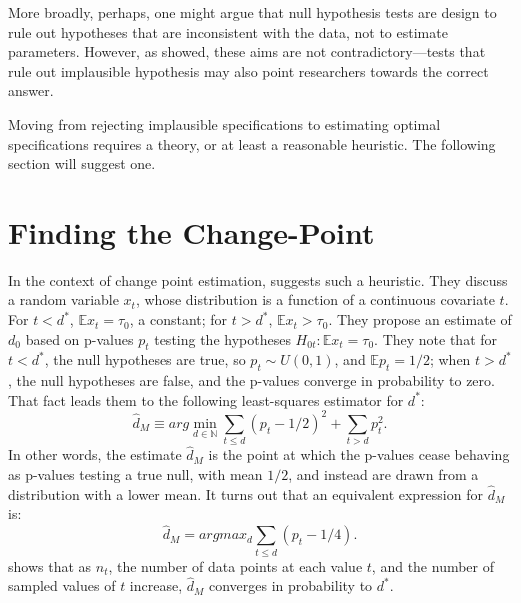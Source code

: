\documentclass[12pt]{article}\usepackage[]{graphicx}\usepackage[]{color}
\newcommand{\dstar}{d^*}
\newcommand{\dhatm}{\hat{d}_M}
\newcommand{\EE}{\mathbb{E}}
\begin{document}
More broadly, perhaps, one might argue that null hypothesis tests are
design to rule out hypotheses that are inconsistent with the data, not
to estimate parameters.
However, as \citet{hodgeslehmann} showed, these aims are not
contradictory---tests that rule out implausible hypothesis may also
point researchers towards the correct answer.

Moving from rejecting implausible specifications to estimating optimal
specifications requires a theory, or at least a reasonable heuristic.
The following section will suggest one.

\section{Finding the Change-Point}\label{sec:change-point}
In the context of change point estimation, \citet{mallik} suggests
such a heuristic.
They discuss a random variable $x_t$, whose distribution is a function
of a continuous covariate $t$.
For $t<d^*$, $\EE x_t=\tau_0$, a constant; for $t>\dstar$, $\EE
x_t>\tau_0$.
They propose an estimate of $d_0$ based on p-values $p_t$
testing the hypotheses $H_{0t}:\EE x_t=\tau_0$.
They note that for $t<\dstar$, the null hypotheses are true, so
$p_t\sim U(0,1)$, and $\EE p_t =1/2$; when $t>\dstar$, the null hypotheses are false, and
the p-values converge in probability to zero.
That fact leads them to the following least-squares estimator for
$\dstar$:
\begin{equation*}
\dhatm\equiv arg\displaystyle\min_{d\in \mathbb{N}} \displaystyle\sum_{t\le d} (p_t -1/2)^2 +
\displaystyle\sum_{t>d} p_t^2.
\end{equation*}
In other words, the estimate $\dhatm$ is the point at which the
p-values cease behaving as p-values testing a true null, with mean
$1/2$, and instead are drawn from a distribution with a lower mean.
It turns out that an equivalent expression for $\dhatm$ is:
\begin{equation}\label{eq:mallikSimple}
\dhatm=argmax_d \displaystyle\sum_{t\le d} (p_t-1/4).
\end{equation}
\citet{mallik} shows that as $n_t$, the number of data points at each value
$t$, and the number of sampled values of $t$ increase, $\dhatm$
converges in probability to $\dstar$.
\end{document}

